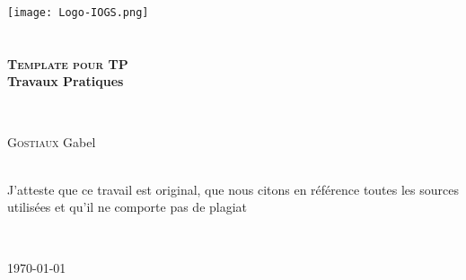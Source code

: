 \begin{titlepage}
\begin{center}

\texttt{[image: Logo-IOGS.png]}~\\[1.5cm]


\textsc{\Large }\\[0.5cm]

\HRule \\[0.4cm]

{\bfseries
\huge \textsc{Template pour TP}\\[0.5cm]
\Large  Travaux Pratiques}

\HRule \\[1cm]

\begin{minipage}{0.8\textwidth}
\begin{flushleft} \large
\textsc{Gostiaux} Gabel \\[1cm]
\end{flushleft}
\end{minipage}


\textsc{\Large }\\[1cm]
J'atteste que ce travail est original, que nous citons en référence toutes les sources utilisées et qu’il ne comporte pas de plagiat

\textsc{\Large }\\[1cm]




\vfill

{\large \today}

\end{center}
\end{titlepage}